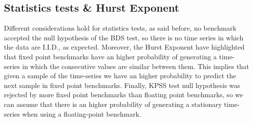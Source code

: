 \subsection{Statistics tests \& Hurst Exponent}
Different considerations hold for statistics tests, as said before, no benchmark accepted the null hypothesis of the BDS test, so there is no time series in which the data are I.I.D., as expected.
Moreover, the Hurst Exponent have highlighted that fixed point benchmarks have an higher probability of generating a time-series in which the consecutive values are similar between them. This implies that given a sample of the time-series we have an higher probability to predict the next sample in fixed point benchmarks.\newline
Finally, KPSS test null hypothesis was rejected by more fixed point benchmarks than floating point benchmarks, so we can assume that there is an higher probability of generating a stationary time-series when using a floating-point benchmark.

